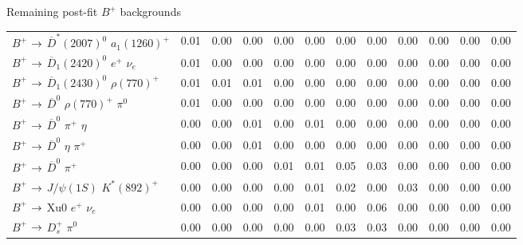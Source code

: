 \documentclass[xcolor=dvipsnames]{beamer}
\begin{document}
\begin{frame}{Remaining post-fit $B^+$ backgrounds}
{\begin{tabular}{lrrrrrrrrrrr}
      $B^{+}$ $\rightarrow$ $\overline{D}^{*}(2007)^{0}$ $a_{1}(1260)^{+}$         &         0.01 &         0.00 &         0.00 &         0.00 &         0.00 &         0.00 &         0.00 &         0.00 &         0.00 &         0.00 &         0.00 \\
      $B^{+}$ $\rightarrow$ $\overline{D}_{1}(2420)^{0}$ $e^{+}$ $\nu_{e}$         &         0.01 &         0.00 &         0.00 &         0.00 &         0.00 &         0.00 &         0.00 &         0.00 &         0.00 &         0.00 &         0.00 \\
      $B^{+}$ $\rightarrow$ $\overline{D}_{1}(2430)^{0}$ $\rho(770)^{+}$           &         0.01 &         0.01 &         0.01 &         0.00 &         0.00 &         0.00 &         0.00 &         0.00 &         0.00 &         0.00 &         0.00 \\
      $B^{+}$ $\rightarrow$ $\overline{D}^{0}$ $\rho(770)^{+}$ $\pi^{0}$           &         0.01 &         0.00 &         0.00 &         0.00 &         0.00 &         0.00 &         0.00 &         0.00 &         0.00 &         0.00 &         0.00 \\
      $B^{+}$ $\rightarrow$ $\overline{D}^{0}$ $\pi^{+}$ $\eta$                    &         0.00 &         0.00 &         0.01 &         0.00 &         0.01 &         0.00 &         0.00 &         0.00 &         0.00 &         0.00 &         0.00 \\
      $B^{+}$ $\rightarrow$ $\overline{D}^{0}$ $\eta$ $\pi^{+}$                    &         0.00 &         0.00 &         0.01 &         0.00 &         0.00 &         0.00 &         0.00 &         0.00 &         0.00 &         0.00 &         0.00 \\
      $B^{+}$ $\rightarrow$ $\overline{D}^{0}$ $\pi^{+}$                           &         0.00 &         0.00 &         0.00 &         0.01 &         0.01 &         0.05 &         0.03 &         0.00 &         0.00 &         0.00 &         0.00 \\
      $B^{+}$ $\rightarrow$ $J/\psi(1S)$ $K^{*}(892)^{+}$                          &         0.00 &         0.00 &         0.00 &         0.00 &         0.01 &         0.02 &         0.00 &         0.03 &         0.00 &         0.00 &         0.00 \\
      $B^{+}$ $\rightarrow$ Xu0 $e^{+}$ $\nu_{e}$                                  &         0.00 &         0.00 &         0.00 &         0.00 &         0.01 &         0.00 &         0.06 &         0.00 &         0.00 &         0.00 &         0.00 \\
      $B^{+}$ $\rightarrow$ $D_{s}^{+}$ $\pi^{0}$                                  &         0.00 &         0.00 &         0.00 &         0.00 &         0.00 &         0.03 &         0.03 &         0.00 &         0.00 &         0.00 &         0.00 \\

\end{tabular}}
\end{frame}
\end{document}
